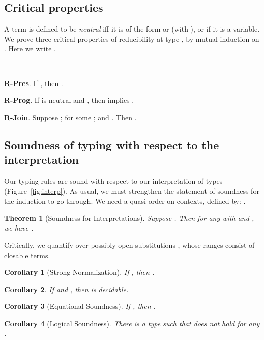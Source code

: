 \documentclass[copyright]{eptcs}
\newtheorem{theorem}{Theorem}
\newtheorem{corollary}{Corollary}
\begin{document}
\subsection{Critical properties}
\label{sec:critprop}

A term is defined to be \emph{neutral} iff it is of the form 
or  (with ), or if it is a
variable.  We prove three critical properties of reducibility at type
, by mutual induction on .  Here we
write .

\ 

\noindent \textbf{R-Pres}. If , then .

\noindent \textbf{R-Prog}. If  is neutral and , then
 implies .

\noindent \textbf{R-Join}. Suppose ;
 for some ; and
. Then .


\subsection{Soundness of typing with respect to the interpretation}

Our typing rules are sound with respect to our interpretation of types
(Figure~\ref{fig:interp}).  As usual, we must strengthen the statement
of soundness for the induction to go through.  We need a quasi-order
 on contexts, defined by:
.

\begin{theorem}[Soundness for Interpretations]
\label{thm:soundness}
Suppose .  Then for any 
with  and , we
have .  
\end{theorem}

\noindent Critically, we quantify over possibly open substitutions
, whose ranges consist of closable terms.  

\begin{corollary}[Strong Normalization]
\label{cor:sn}
If , then .
\end{corollary}

\begin{corollary}
\label{cor:eqdec}
If  and , then  is decidable.
\end{corollary}

\begin{corollary}[Equational Soundness]
\label{cor:eqsnd}
If , then .
\end{corollary}

\begin{corollary}[Logical Soundness]
There is a type  such that  does not hold for any .
\end{corollary}
\end{document}
